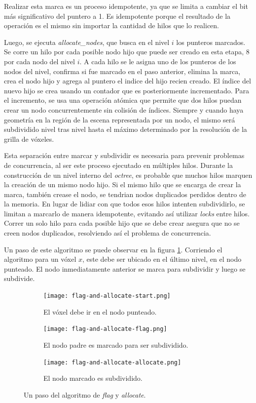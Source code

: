 Realizar esta marca es un proceso idempotente, ya que se limita a cambiar el bit más significativo del puntero a 1.
Es idempotente porque el resultado de la operación es el mismo sin importar la cantidad de hilos que lo realicen.

Luego, se ejecuta \textit{allocate\_nodes}, que busca en el nivel $i$ los punteros marcados. 
Se corre un hilo por cada posible nodo hijo que puede ser creado en esta etapa, $8$ por cada nodo del nivel $i$.
A cada hilo se le asigna uno de los punteros de los nodos del nivel, confirma si fue marcado en el paso anterior, elimina la marca, crea el nodo hijo y agrega al puntero el indice del hijo recien creado.
El índice del nuevo hijo se crea usando un contador que es posteriormente incrementado.
Para el incremento, se usa una operación atómica que permite que dos hilos puedan crear un nodo concurrentemente sin colisión de índices.
Siempre y cuando haya geometría en la región de la escena representada por un nodo, el mismo será subdividido nivel tras nivel hasta el máximo determinado por la resolución de la grilla de vóxeles.

Esta separación entre marcar y subdividir es necesaria para prevenir problemas de concurrencia, al ser este proceso ejecutado en múltiples hilos.
Durante la construcción de un nivel interno del \textit{octree}, es probable que muchos hilos marquen la creación de un mismo nodo hijo.
Si el mismo hilo que se encarga de crear la marca, también crease el nodo, se tendrian nodos duplicados perdidos dentro de la memoria.
En lugar de lidiar con que todos esos hilos intenten subdividirlo, se limitan a marcarlo de manera idempotente, evitando así utilizar \textit{locks} entre hilos.
Correr un solo hilo para cada posible hijo que se debe crear asegura que no se creen nodos duplicados, resolviendo así el problema de concurrencia.

Un paso de este algoritmo se puede observar en la figura \ref{fig:flag-and-allocate}.
Corriendo el algoritmo para un vóxel $x$, este debe ser ubicado en el último nivel, en el nodo punteado.
El nodo inmediatamente anterior se marca para subdividir y luego se subdivide.

\begin{figure}[ht]
    \begin{subfigure}{.32\textwidth}
        \centering
        \texttt{[image: flag-and-allocate-start.png]}
        \caption{El vóxel debe ir en el nodo punteado.}
    \end{subfigure}
    \begin{subfigure}{.32\textwidth}
        \centering
        \texttt{[image: flag-and-allocate-flag.png]}
        \caption{El nodo padre es marcado para ser subdividido.}
    \end{subfigure}
    \begin{subfigure}{.32\textwidth}
        \centering
        \texttt{[image: flag-and-allocate-allocate.png]}
        \caption{El nodo marcado es subdividido.}
    \end{subfigure}
    \caption{Un paso del algoritmo de \textit{flag} y \textit{allocate}.}
    \label{fig:flag-and-allocate}
\end{figure}

